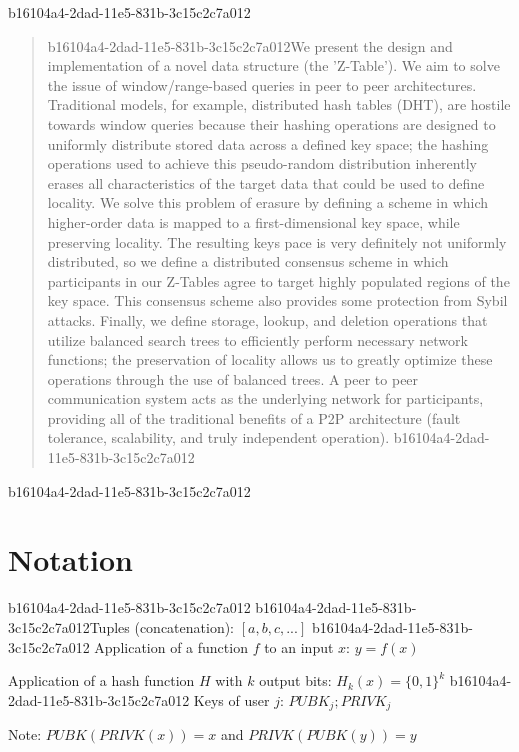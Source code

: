 \documentclass[12pt]{article}
\begin{document}
\maketitle

b16104a4-2dad-11e5-831b-3c15c2c7a012\begin{abstract}
b16104a4-2dad-11e5-831b-3c15c2c7a012We present the design and implementation of a novel data structure (the 'Z-Table'). We aim to solve the issue of window/range-based queries in peer to peer architectures. Traditional models, for example,  distributed hash tables (DHT), are hostile towards window queries because their hashing operations are designed to uniformly distribute stored data across a defined key space; the hashing operations used to achieve this pseudo-random distribution inherently erases all characteristics of the target data that could be used to define locality. We solve this problem of erasure by defining a scheme in which higher-order data is mapped to a first-dimensional key space, while preserving locality. The resulting keys pace is very definitely not uniformly distributed, so we define a distributed consensus scheme in which participants in our Z-Tables agree to target highly populated regions of the key space. This consensus scheme also provides some protection from Sybil attacks. Finally, we define storage, lookup, and deletion operations that utilize balanced search trees to efficiently perform necessary network functions; the preservation of locality allows us to greatly optimize these operations through the use of balanced trees. A peer to peer communication system acts as the underlying network for participants, providing all of the traditional benefits of a P2P architecture (fault tolerance, scalability, and truly independent operation).
b16104a4-2dad-11e5-831b-3c15c2c7a012\end{abstract}
b16104a4-2dad-11e5-831b-3c15c2c7a012
\section{Notation}
b16104a4-2dad-11e5-831b-3c15c2c7a012
b16104a4-2dad-11e5-831b-3c15c2c7a012Tuples (concatenation): $[a,b,c,...]$
b16104a4-2dad-11e5-831b-3c15c2c7a012
Application of a function $f$ to an input $x$: $y=f(x)$

Application of a hash function $H$ with $k$ output bits: $H_{k}(x) = \{0,1\}^k$
b16104a4-2dad-11e5-831b-3c15c2c7a012
Keys of user $j$: $ PUBK_j; PRIVK_j $

Note: $PUBK(PRIVK(x)) = x$ and $PRIVK(PUBK(y)) = y$~
\end{document}
